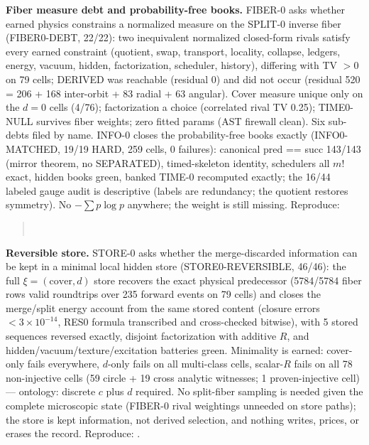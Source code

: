 \documentclass[11pt]{article}
\begin{document}
\textbf{Fiber measure debt and probability-free books.} FIBER-0 asks
whether earned physics constrains a normalized measure on the SPLIT-0
inverse fiber (FIBER0-DEBT, 22/22): two inequivalent normalized closed-form
rivals satisfy every earned constraint (quotient, swap, transport,
locality, collapse, ledgers, energy, vacuum, hidden, factorization,
scheduler, history), differing with TV $> 0$ on 79 cells; DERIVED was
reachable (residual 0) and did not occur (residual 520 = 206 + 168
inter-orbit + 83 radial + 63 angular). Cover measure unique only on the
$d = 0$ cells (4/76); factorization a choice (correlated rival TV 0.25);
TIME0-NULL survives fiber weights; zero fitted params (AST firewall
clean). Six sub-debts filed by name. INFO-0 closes the probability-free
books exactly (INFO0-MATCHED, 19/19 HARD, 259 cells, 0 failures):
canonical pred == succ 143/143 (mirror theorem, no SEPARATED),
timed-skeleton identity, schedulers all $m!$ exact, hidden books green,
banked TIME-0 recomputed exactly; the 16/44 labeled gauge audit is
descriptive (labels are redundancy; the quotient restores symmetry).
No $-\sum p\log p$ anywhere; the weight is still missing.
Reproduce:
\begin{quote}\small
{}\\
\end{quote}

\textbf{Reversible store.} STORE-0 asks whether the merge-discarded
information can be kept in a minimal local hidden store
(STORE0-REVERSIBLE, 46/46): the full $\xi = (\mathrm{cover}, d)$ store
recovers the exact physical predecessor (5784/5784 fiber rows valid
roundtrips over 235 forward events on 79 cells) and closes the
merge/split energy account from the same stored content (closure errors
$< 3\times10^{-14}$, RES0 formula transcribed and cross-checked
bitwise), with 5 stored sequences reversed exactly, disjoint
factorization with additive $R$, and hidden/vacuum/texture/excitation
batteries green. Minimality is earned: cover-only fails everywhere,
$d$-only fails on all multi-class cells, scalar-$R$ fails on all 78
non-injective cells (59 circle + 19 cross analytic witnesses; 1
proven-injective cell) --- ontology: discrete $c$ plus $d$ required. No
split-fiber sampling is needed given the complete microscopic state
(FIBER-0 rival weightings unneeded on store paths); the store is kept
information, not derived selection, and nothing writes, prices, or
erases the record.
Reproduce: .
\end{document}
